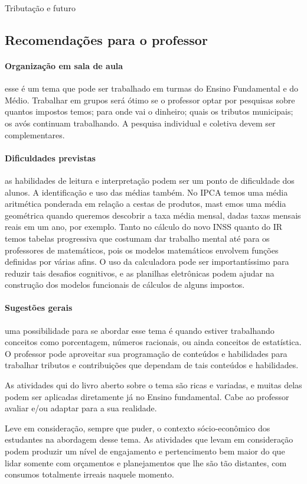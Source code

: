 \begin{paginatexto}{Tributação e futuro}
\subsection*{Recomendações para o professor}

\paragraph{Organização em sala de aula} esse é um tema que pode ser trabalhado em turmas do Ensino Fundamental e do Médio. Trabalhar em grupos será ótimo se o professor optar por pesquisas sobre quantos impostos temos; para onde vai o dinheiro; quais os tributos municipais; os avós continuam trabalhando. A pesquisa individual e coletiva devem ser complementares.

\paragraph{Dificuldades previstas} as habilidades de leitura e interpretação podem ser um ponto de dificuldade dos alunos. A identificação e uso das médias também. No IPCA temos uma média aritmética ponderada em relação a cestas de produtos, mast emos uma média geométrica quando queremos descobrir a taxa média mensal, dadas taxas mensais reais em um ano, por exemplo. Tanto no cálculo do novo INSS quanto do IR temos tabelas progressiva que costumam dar trabalho mental até para os professores de matemáticos, pois os modelos matemáticos envolvem funções definidas por várias afins. O uso da calculadora pode ser importantíssimo para reduzir tais desafios cognitivos, e as planilhas eletrônicas podem ajudar na construção dos modelos funcionais de cálculos de alguns impostos.

\paragraph{Sugestões gerais} uma possibilidade para se abordar esse tema é quando estiver trabalhando conceitos como porcentagem, números racionais, ou ainda conceitos de estatística. O professor pode aproveitar sua programação de conteúdos e habilidades para trabalhar tributos e contribuições que dependam de tais conteúdos e habilidades.

As atividades qui do livro aberto sobre o tema são ricas e variadas, e muitas delas podem ser aplicadas diretamente já no Ensino fundamental. Cabe ao professor avaliar e/ou adaptar para a sua realidade. 

Leve em consideração, sempre que puder, o contexto sócio-econômico dos estudantes na abordagem desse tema. As atividades que levam em consideração podem produzir um nível de engajamento e pertencimento bem maior do que lidar somente com orçamentos e planejamentos que lhe são tão distantes, com consumos totalmente irreais naquele momento. 


\end{paginatexto}

